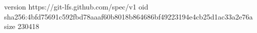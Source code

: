 version https://git-lfs.github.com/spec/v1
oid sha256:4bfd75691c592fbd78aaaf60b8018b864686bf49223194e4cb25d1ac33a2e76a
size 230418
